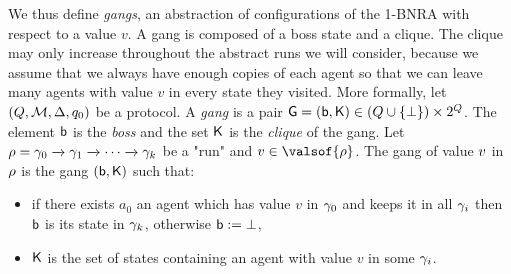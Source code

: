 	We thus define \emph{gangs}, an abstraction of configurations 
	 of the 1-BNRA with respect to a value $v$. A gang is composed of a boss state and a clique. The clique may only increase throughout the abstract runs we will consider, because we assume that we always have enough copies of each agent so that we can leave many agents with value $v$ in every state they visited.
	\AP More formally, let $(Q,\mathcal{M}, \Delta, q_0)$ be a protocol.
	A \emph{gang} is a pair $\mathsf{G} = (\mathsf{b}, \mathsf{K}) \in (Q \cup \{\bot\}) \times 2^{Q}$. The element $\mathsf{b}$ is the \emph{boss} and the set $\mathsf{K}$ is the \emph{clique} of the gang. 	
	Let $\rho = \gamma_0 \xrightarrow{} \gamma_1 \xrightarrow{} \cdots \xrightarrow{} \gamma_k$ be a "run" and $\aval \in \valsof{\run}$. The gang of value $v$ in $\rho$ is the gang $(\mathsf{b}, \mathsf{K})$ such that:
	\begin{itemize}
		\item if there exists $a_0$ an agent which has value $v$ in $\gamma_0$ and keeps it in all $\gamma_i$ then $\mathsf{b}$ is its state in $\gamma_k$, otherwise $\mathsf{b} := \bot$, 
		\item  $\mathsf{K}$ is the set of states containing an agent with value $v$ in some $\gamma_i$.
	\end{itemize}
	
  
	


